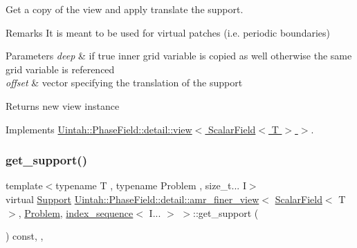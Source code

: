 Get a copy of the view and apply translate the support. 

\begin{DoxyRemark}{Remarks}
It is meant to be used for virtual patches (i.\+e. periodic boundaries)
\end{DoxyRemark}

\begin{DoxyParams}{Parameters}
{\em deep} & if true inner grid variable is copied as well otherwise the same grid variable is referenced \\
\hline
{\em offset} & vector specifying the translation of the support \\
\hline
\end{DoxyParams}
\begin{DoxyReturn}{Returns}
new view instance 
\end{DoxyReturn}


Implements \hyperlink{classUintah_1_1PhaseField_1_1detail_1_1view_3_01ScalarField_3_01T_01_4_01_4_abd928104240e329f3bc4441ebab7c50c}{Uintah\+::\+Phase\+Field\+::detail\+::view$<$ Scalar\+Field$<$ T $>$ $>$}.

\mbox{\label{classUintah_1_1PhaseField_1_1detail_1_1amr__finer__view_3_01ScalarField_3_01T_01_4_00_01Problem_810ae3f886a4d3bdb2b37c629369a2ec_adfbb25e7253411ffab2a2bc035e87a6b}} 
\subsubsection{\texorpdfstring{get\+\_\+support()}{get\_support()}}
{\footnotesize\ttfamily template$<$typename T , typename Problem , size\+\_\+t... I$>$ \\
virtual \hyperlink{classUintah_1_1PhaseField_1_1Support}{Support} \hyperlink{classUintah_1_1PhaseField_1_1detail_1_1amr__finer__view}{Uintah\+::\+Phase\+Field\+::detail\+::amr\+\_\+finer\+\_\+view}$<$ \hyperlink{structUintah_1_1PhaseField_1_1ScalarField}{Scalar\+Field}$<$ T $>$, \hyperlink{classUintah_1_1PhaseField_1_1Problem}{Problem}, \hyperlink{namespaceUintah_1_1PhaseField_a237de804d99512e50613aff7c94a9461}{index\+\_\+sequence}$<$ I... $>$ $>$\+::get\+\_\+support (\begin{DoxyParamCaption}{ }\end{DoxyParamCaption}) const\hspace{0.3cm}{\ttfamily [inline]}, {\ttfamily [override]}, {\ttfamily [virtual]}}



